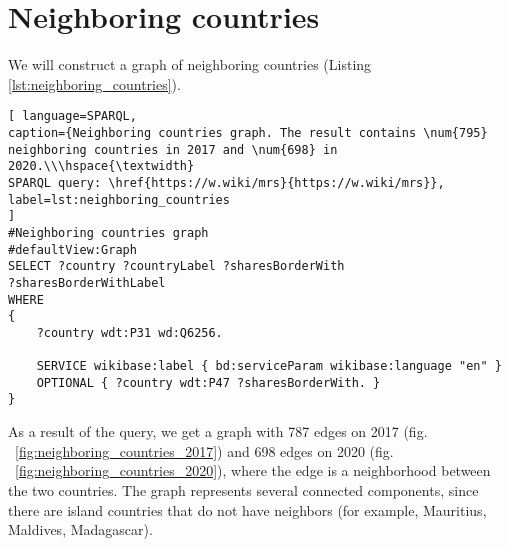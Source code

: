 \section{Neighboring countries}

We will construct a graph of neighboring countries (Listing \ref{lst:neighboring_countries}).
\begin{lstlisting}[ language=SPARQL, 
caption={Neighboring countries graph. The result contains \num{795} neighboring countries in 2017 and \num{698} in 2020.\\\hspace{\textwidth}
SPARQL query: \href{https://w.wiki/mrs}{https://w.wiki/mrs}},
label=lst:neighboring_countries
]
#Neighboring countries graph
#defaultView:Graph
SELECT ?country ?countryLabel ?sharesBorderWith 
?sharesBorderWithLabel
WHERE
{
	?country wdt:P31 wd:Q6256.
	
	SERVICE wikibase:label { bd:serviceParam wikibase:language "en" }
	OPTIONAL { ?country wdt:P47 ?sharesBorderWith. }
}
\end{lstlisting}


\begin{figure*}
	{
		\setlength{\fboxsep}{0pt}%
		\setlength{\fboxrule}{1pt}%
	}
	\caption{Neighboring countries graph, 2017.
	}%
	\label{fig:neighboring_countries_2017}%
\end{figure*}

\begin{figure*}
	{
		\setlength{\fboxsep}{0pt}%
		\setlength{\fboxrule}{1pt}%
	}
	\caption{Neighboring countries graph, 2020.
	}%
	\label{fig:neighboring_countries_2020}%
\end{figure*}

As a result of the query, we get a graph with 787 edges on 2017 (fig. ~\ref{fig:neighboring_countries_2017}) and 698 edges on 2020 (fig. ~\ref{fig:neighboring_countries_2020}), where the edge is a neighborhood between the two countries. The graph represents several connected components, since there are island countries that do not have neighbors (for example, Mauritius, Maldives, Madagascar).

